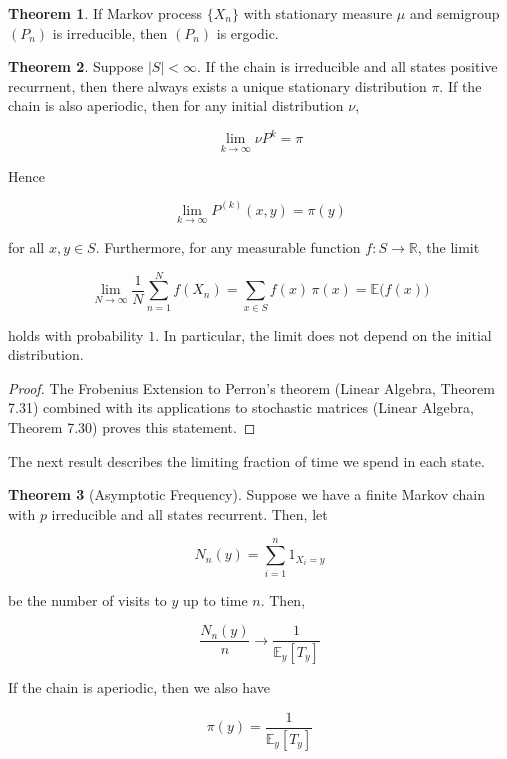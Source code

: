 \documentclass{article}
\theoremstyle{definition}
\newtheorem{theorem}{Theorem}[section]
\theoremstyle{remark}
\theoremstyle{definition}
\begin{document}
    \begin{theorem}
      If Markov process $\{X_n\}$ with stationary measure $\mu$ and semigroup $(P_n)$ is irreducible, then $(P_n)$ is ergodic. 
    \end{theorem}

    \begin{theorem}
      Suppose $|S| < \infty$. If the chain is irreducible and all states positive recurrnent, then there always exists a unique stationary distribution $\pi$. If the chain is also aperiodic, then for any initial distribution $\nu$, 

        \[\lim_{k \rightarrow \infty} \nu P^k = \pi \]

      Hence

        \[\lim_{k \rightarrow \infty} P^{(k)}(x, y) = \pi(y)\]

      for all $x, y \in S$. Furthermore, for any measurable function $f: S \longrightarrow \mathbb{R}$, the limit 

        \[\lim_{N \rightarrow \infty} \frac{1}{N} \sum_{n=1}^N f(X_n) = \sum_{x \in S} f(x)\, \pi(x) = \mathbb{E} \big( f(x) \big)\]

      holds with probability $1$. In particular, the limit does not depend on the initial distribution. 
    \end{theorem}
    \begin{proof}
      The Frobenius Extension to Perron's theorem (Linear Algebra, Theorem 7.31) combined with its applications to stochastic matrices (Linear Algebra, Theorem 7.30) proves this statement. 
    \end{proof}

    The next result describes the limiting fraction of time we spend in each state. 

    \begin{theorem}[Asymptotic Frequency]
      Suppose we have a finite Markov chain with $p$ irreducible and all states recurrent. Then, let 

        \[N_n (y) = \sum_{i=1}^n 1_{X_i = y}\]

      be the number of visits to $y$ up to time $n$. Then, 

        \[\frac{N_n (y)}{n} \rightarrow \frac{1}{\mathbb{E}_y [T_y]}\]

      If the chain is aperiodic, then we also have 

        \[\pi(y) = \frac{1}{\mathbb{E}_y [T_y]}\]
    \end{theorem}
\end{document}
